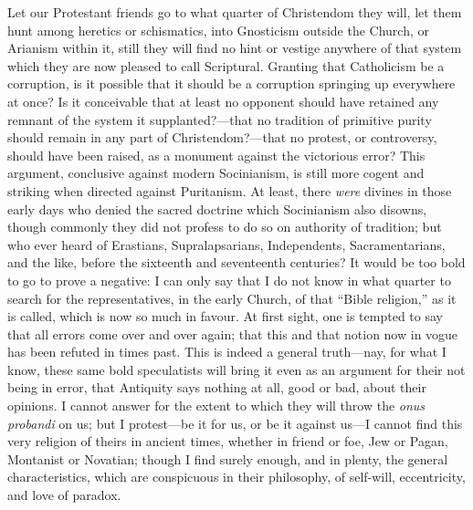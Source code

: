 Let our Protestant friends go to what quarter of Christendom they
will, let them hunt among heretics or schismatics, into Gnosticism
outside the Church, or Arianism within it, still they will find no
hint or vestige anywhere of that system which they are now pleased to
call Scriptural. Granting that Catholicism be a corruption, is it
possible that it should be a corruption springing up everywhere at
once? Is it conceivable that at least no opponent should have retained
any remnant of the system it supplanted?—that no tradition of
primitive purity should remain in any part of Christendom?—that
no protest, or controversy, should have been raised, as a monument
against the victorious error? This argument, conclusive against modern
Socinianism, is still more cogent and striking when directed against
Puritanism. At least, there \emph{were} divines in those early days
who denied the sacred doctrine which Socinianism also disowns, though
commonly they did not profess to do so on authority of tradition; but
who ever heard of Erastians, Supralapsarians, Independents,
Sacramentarians, and the like, before the sixteenth and seventeenth
centuries? It would be too bold to go to prove a negative: I can only
say that I do not know in what quarter to search for the
representatives, in the early Church, of that ``Bible
religion,'' as it is called, which is now so much in favour. At
first sight, one is tempted to say that all errors come over and over
again; that this and that notion now in vogue has been refuted in
times past. This is indeed a general truth—nay, for what I know,
these same bold speculatists will bring it even as an argument for
their not being in error, that Antiquity says nothing at all, good or
bad, about their opinions. I cannot answer for the extent to which
they will throw the \emph{onus probandi} on us; but I protest—be it
for us, or be it against us—I cannot find this very religion of
theirs in ancient times, whether in friend or foe, Jew or Pagan,
Montanist or Novatian; though I find surely enough, and in plenty, the
general characteristics, which are conspicuous in their philosophy, of
self-will, eccentricity, and love of paradox.

